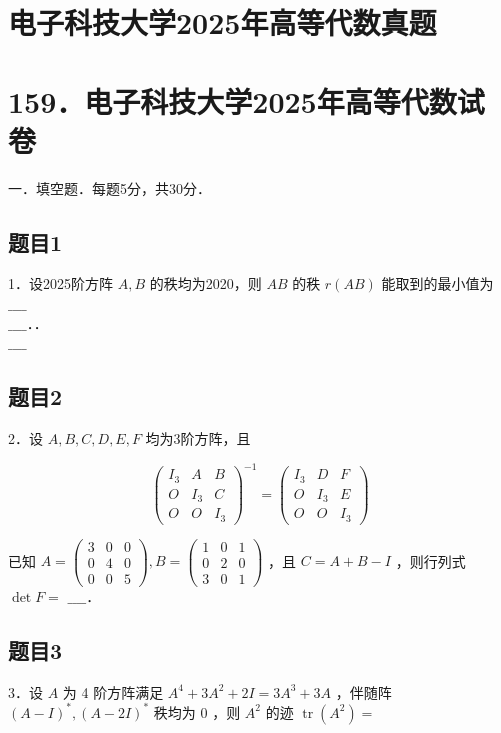 \documentclass{article}
\begin{document}
\section*{电子科技大学2025年高等代数真题}
\section*{159．电子科技大学2025年高等代数试卷}
一．填空题．每题5分，共30分．\\

\subsection{题目1}
1．设2025阶方阵 \(A, B\) 的秩均为2020，则 \(A B\) 的秩 \(r(A B)\) 能取到的最小值为 \(\_\_\_\_\)\\
\(\_\_\_\_\)．．\\
\(\_\_\_\_\)

\subsection{题目2}
2．设 \(A, B, C, D, E, F\) 均为3阶方阵，且

\[
\left(\begin{array}{lll}
I_{3} & A & B \\
O & I_{3} & C \\
O & O & I_{3}
\end{array}\right)^{-1}=\left(\begin{array}{lll}
I_{3} & D & F \\
O & I_{3} & E \\
O & O & I_{3}
\end{array}\right)
\]

已知 \(A=\left(\begin{array}{lll}3 & 0 & 0 \\ 0 & 4 & 0 \\ 0 & 0 & 5\end{array}\right), B=\left(\begin{array}{lll}1 & 0 & 1 \\ 0 & 2 & 0 \\ 3 & 0 & 1\end{array}\right)\) ，且 \(C=A+B-I\) ，则行列式 \(\operatorname{det} F=\) \(\_\_\_\_\)．

\subsection{题目3}
3．设 \(A\) 为 4 阶方阵满足 \(A^{4}+3 A^{2}+2 I=3 A^{3}+3 A\) ，伴随阵 \((A-I)^{*},(A-2 I)^{*}\) 秩均为 0 ，则 \(A^{2}\) 的迹 \(\operatorname{tr}\left(A^{2}\right)=\)
\end{document}

